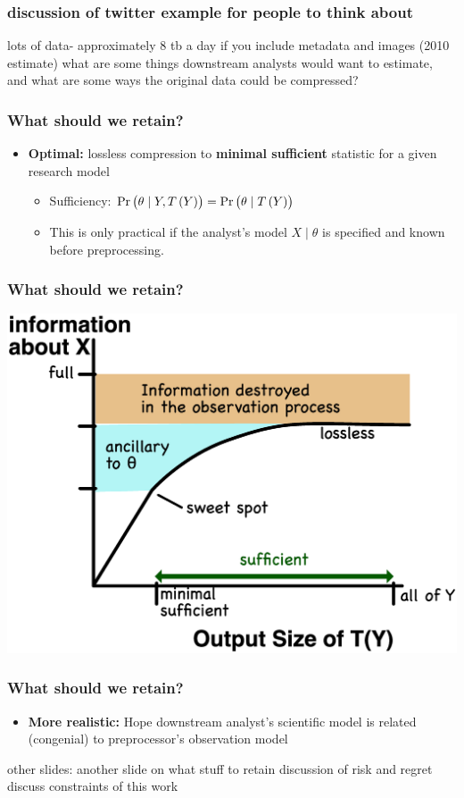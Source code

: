 \documentclass[10pt, compress]{beamer}
\begin{document}
\begin{frame}[fragile]
    \frametitle{discussion of twitter example for people to think about}

 lots of data- approximately 8 tb a day if you include metadata and images (2010 estimate)
 what are some things downstream analysts would want to estimate, and what are some ways the original data could be compressed?
\end{frame}

\begin{frame}[fragile]
    \frametitle{What should we retain?}
    \begin{itemize}
    	\item \textbf{Optimal:} lossless compression to \textbf{minimal sufficient} statistic for a given research model
    		\begin{itemize}
    			\item Sufficiency: $\Pr\del{\theta \mid Y,T\del{Y}}=\Pr\del{\theta \mid T\del{Y}}$
    			\item This is only practical if the analyst's model $X \mid \theta$ is specified and known before preprocessing.
    		\end{itemize}
    \end{itemize}
\end{frame}
\begin{frame}[fragile]
    \frametitle{What should we retain?}
    \includegraphics[width=\textwidth]{information.eps}
\end{frame}
\begin{frame}[fragile]
    \frametitle{What should we retain?}
    \begin{itemize}
    	\item \textbf{More realistic:} Hope downstream analyst's scientific model is related (congenial) to preprocessor's observation model
    \end{itemize}
\end{frame}

\begin{frame}[fragile]

    other slides:
    another slide on what stuff to retain
    discussion of risk and regret
    discuss constraints of this work


\end{frame}
\end{document}

